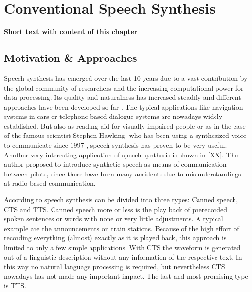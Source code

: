 

\section{Conventional Speech Synthesis}
\label{sec:speech}

\textbf{\color{ACMRed}Short text with content of this chapter}

\subsection{Motivation \& Approaches}
\label{subsec:convenspeech}

Speech synthesis has emerged over the last 10 years due to a vast contribution by the global community of researchers and the increasing computational power for data processing. Its quality and naturalness has increased steadily and different approaches have been developed so far \cite{suendermann:challenges}. The typical applications like navigation systems in cars or telephone-based dialogue systems are nowadays widely established. But also as reading aid for visually impaired people \cite{readspeaker:tts} or as in the case of the famous scientist Stephen Hawking, who has been using a synthesized voice to communicate since 1997 \cite{hawking:speech}, speech synthesis has proven to be very useful. Another very interesting application of speech synthesis is shown in [XX]. The author proposed to introduce synthetic speech as means of communication between pilots, since there have been many accidents due to misunderstandings at radio-based communication. %

According to \cite{hinterleitner:quality} speech synthesis can be divided into three types: Canned speech, \ac{CTS} and \ac{TTS}. Canned speech more or less is the play back of prerecorded spoken sentences or words with none or very little adjustments. A typical example are the announcements on train stations. Because of the high effort of recording everything (almost) exactly as it is played back, this approach is limited to only a few simple applications. With \ac{CTS} the waveform is generated out of a linguistic description without any information of the respective text. In this way no natural language processing is required, but nevertheless \ac{CTS} nowadays has not made any important impact. The last and most promising type is \ac{TTS}.

